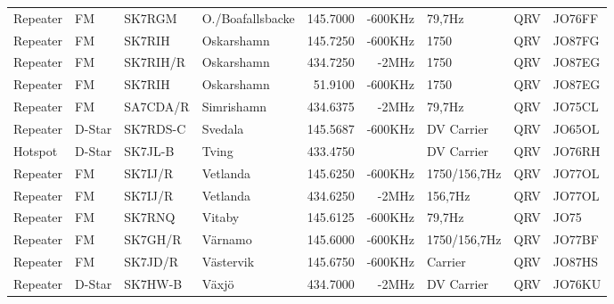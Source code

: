 \begin{landscape}
\begin{longtable}{llllrrlcl}
	Repeater                  & FM            & SK7RGM        & O./Boafallsbacke    & 145.7000          & -600KHz        & 79,7Hz           & QRV             & JO76FF           \\
	Repeater                  & FM            & SK7RIH        & Oskarshamn          & 145.7250          & -600KHz        & 1750             & QRV             & JO87FG           \\
	Repeater                  & FM            & SK7RIH/R      & Oskarshamn          & 434.7250          & -2MHz          & 1750             & QRV             & JO87EG           \\
	Repeater                  & FM            & SK7RIH        & Oskarshamn          & 51.9100           & -600KHz        & 1750             & QRV             & JO87EG           \\
	Repeater                  & FM            & SA7CDA/R      & Simrishamn          & 434.6375          & -2MHz          & 79,7Hz           & QRV             & JO75CL           \\
	Repeater                  & D-Star        & SK7RDS-C      & Svedala             & 145.5687          & -600KHz        & DV Carrier       & QRV             & JO65OL           \\
	Hotspot                   & D-Star        & SK7JL-B       & Tving               & 433.4750          &                & DV Carrier       & QRV             & JO76RH           \\
	Repeater                  & FM            & SK7IJ/R       & Vetlanda            & 145.6250          & -600KHz        & 1750/156,7Hz     & QRV             & JO77OL           \\
	Repeater                  & FM            & SK7IJ/R       & Vetlanda            & 434.6250          & -2MHz          & 156,7Hz          & QRV             & JO77OL           \\
	Repeater                  & FM            & SK7RNQ        & Vitaby              & 145.6125          & -600KHz        & 79,7Hz           & QRV             & JO75             \\
	Repeater                  & FM            & SK7GH/R       & Värnamo             & 145.6000          & -600KHz        & 1750/156,7Hz     & QRV             & JO77BF           \\
	Repeater                  & FM            & SK7JD/R       & Västervik           & 145.6750          & -600KHz        & Carrier          & QRV             & JO87HS           \\
	Repeater                  & D-Star        & SK7HW-B       & Växjö               & 434.7000          & -2MHz          & DV Carrier       & QRV             & JO76KU
\end{longtable}
\normalsize

\end{landscape}
